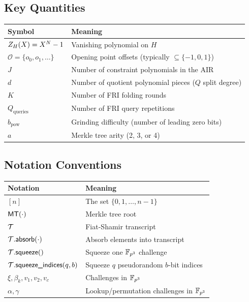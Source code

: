 \subsection{Key Quantities}

\begin{center}
\renewcommand{\arraystretch}{1.3}
\begin{tabular}{@{}ll@{}}
  \toprule
  Symbol & Meaning \\
  \midrule
  $Z_H(X) = X^N - 1$ & Vanishing polynomial on $H$ \\
  $\mathcal{O} = \{o_0, o_1, \ldots\}$ & Opening point offsets (typically $\subseteq \{-1,0,1\}$) \\
  $J$ & Number of constraint polynomials in the AIR \\
  $d$ & Number of quotient polynomial pieces ($Q$ split degree) \\
  $K$ & Number of FRI folding rounds \\
  $Q_{\mathrm{queries}}$ & Number of FRI query repetitions \\
  $b_{\mathrm{pow}}$ & Grinding difficulty (number of leading zero bits) \\
  $a$ & Merkle tree arity (2, 3, or 4) \\
  \bottomrule
\end{tabular}
\end{center}

\subsection{Notation Conventions}

\begin{center}
\renewcommand{\arraystretch}{1.3}
\begin{tabular}{@{}ll@{}}
  \toprule
  Notation & Meaning \\
  \midrule
  $[n]$ & The set $\{0, 1, \ldots, n-1\}$ \\
  $\textsf{MT}(\cdot)$ & Merkle tree root \\
  $\mathcal{T}$ & Fiat-Shamir transcript \\
  $\mathcal{T}.\textsf{absorb}(\cdot)$ & Absorb elements into transcript \\
  $\mathcal{T}.\textsf{squeeze}()$ & Squeeze one $\mathbb{F}_{p^3}$ challenge \\
  $\mathcal{T}.\textsf{squeeze\_indices}(q, b)$ & Squeeze $q$ pseudorandom $b$-bit indices \\
  $\xi, \beta_k, v_1, v_2, v_c$ & Challenges in $\mathbb{F}_{p^3}$ \\
  $\alpha, \gamma$ & Lookup/permutation challenges in $\mathbb{F}_{p^3}$ \\
  \bottomrule
\end{tabular}
\end{center}

